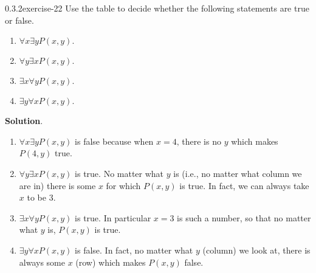 \documentclass[twoside,11pt,]{book}
\numberwithin{equation}{chapter}
\begin{document}
\begin{divisionsolution}{0.3.2}{}{exercise-22}%
\hypertarget{p-548}{}%
Use the table to decide whether the following statements are true or false.\leavevmode%
\begin{enumerate}[label=(\alph*)]
\item\hypertarget{li-548}{}\hypertarget{p-549}{}%
\(\forall x \exists y P(x,y)\text{.}\) %
\item\hypertarget{li-553}{}\hypertarget{p-550}{}%
\(\forall y \exists x P(x,y)\text{.}\) %
\item\hypertarget{li-558}{}\hypertarget{p-551}{}%
\(\exists x \forall y P(x,y)\text{.}\) %
\item\hypertarget{li-563}{}\hypertarget{p-552}{}%
\(\exists y \forall x P(x,y)\text{.}\) %
\end{enumerate}
%
\par\smallskip%
\noindent\textbf{Solution}.\quad%
\hypertarget{p-553}{}%
\leavevmode%
\begin{enumerate}[label=(\alph*)]
\item\hypertarget{li-568}{}\hypertarget{p-554}{}%
\(\forall x \exists y P(x,y)\) is false because when \(x = 4\text{,}\) there is no \(y\) which makes \(P(4,y)\) true.%
\item\hypertarget{li-569}{}\hypertarget{p-555}{}%
\(\forall y \exists x P(x,y)\) is true. No matter what \(y\) is (i.e., no matter what column we are in) there is some \(x\) for which \(P(x,y)\) is true. In fact, we can always take \(x\) to be \(3\text{.}\)%
\item\hypertarget{li-570}{}\hypertarget{p-556}{}%
\(\exists x \forall y P(x,y)\) is true. In particular \(x=3\) is such a number, so that no matter what \(y\) is, \(P(x,y)\) is true.%
\item\hypertarget{li-571}{}\hypertarget{p-557}{}%
\(\exists y \forall x P(x,y)\) is false. In fact, no matter what \(y\) (column) we look at, there is always some \(x\) (row) which makes \(P(x,y)\) false.%
\end{enumerate}
%
\end{divisionsolution}%
\end{document}
